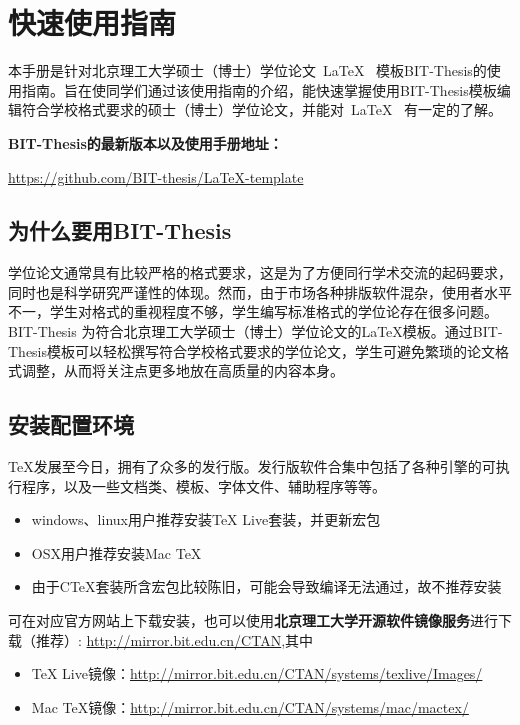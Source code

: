 
\chapter{快速使用指南}
\label{chap:what}

本手册是针对北京理工大学硕士（博士）学位论文~\LaTeX~ 模板BIT-Thesis的使用指南。旨在使同学们通过该使用指南的介绍，能快速掌握使用BIT-Thesis模板编辑符合学校格式要求的硕士（博士）学位论文，并能对~\LaTeX~ 有一定的了解。

\textbf{BIT-Thesis的最新版本以及使用手册地址：}
\begin{center}
\url{https://github.com/BIT-thesis/LaTeX-template}
\end{center}

\section{为什么要用BIT-Thesis}
\label{sec:why}
学位论文通常具有比较严格的格式要求，这是为了方便同行学术交流的起码要求，同时也是科学研究严谨性的体现。然而，由于市场各种排版软件混杂，使用者水平不一，学生对格式的重视程度不够，学生编写标准格式的学位论存在很多问题。BIT-Thesis 为符合北京理工大学硕士（博士）学位论文的LaTeX模板。通过BIT-Thesis模板可以轻松撰写符合学校格式要求的学位论文，学生可避免繁琐的论文格式调整，从而将关注点更多地放在高质量的内容本身。

\section{安装配置环境}
\label{sec:requirements}

\TeX 发展至今日，拥有了众多的发行版。发行版软件合集中包括了各种引擎的可执行程序，以及一些文档类、模板、字体文件、辅助程序等等。

\begin{itemize}
\item windows、linux用户推荐安装TeX Live套装，并更新宏包
\item OSX用户推荐安装Mac TeX
\item 由于CTeX套装所含宏包比较陈旧，可能会导致编译无法通过，故不推荐安装
\end{itemize}

可在对应官方网站上下载安装，也可以使用\textbf{北京理工大学开源软件镜像服务}进行下载（推荐）: \url{http://mirror.bit.edu.cn/CTAN},其中
\begin{itemize}
\item TeX Live镜像：\url{http://mirror.bit.edu.cn/CTAN/systems/texlive/Images/}
\item Mac TeX镜像：\url{http://mirror.bit.edu.cn/CTAN/systems/mac/mactex/}
\end{itemize}



